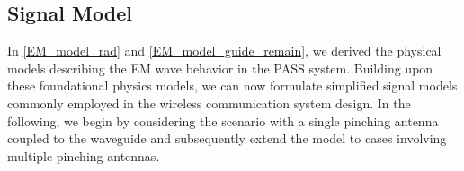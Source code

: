



\subsection{Signal Model}
In \eqref{EM_model_rad} and \eqref{EM_model_guide_remain}, we derived the physical models describing the EM wave behavior in the PASS system. Building upon these foundational physics models, we can now formulate simplified signal models commonly employed in the wireless communication system design. In the following, we begin by considering the scenario with a single pinching antenna coupled to the waveguide and subsequently extend the model to cases involving multiple pinching antennas.

